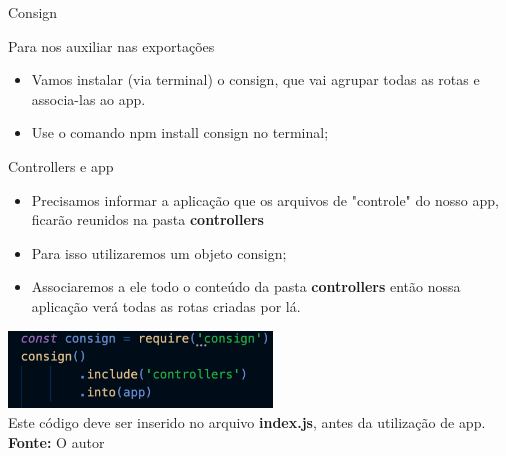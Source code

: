 \documentclass{beamer}
\begin{document}
    \begin{frame}[label=lists]{Consign}
		\begin{exampleblock}{Para nos auxiliar nas exportações}
	\begin{itemize}
	\item Vamos instalar (via terminal) o consign, que vai agrupar todas as rotas e associa-las ao \alert{app}.
	\item Use o comando \alert{npm install consign} no terminal;
	\end{itemize}
	\end{exampleblock}
    \end{frame}
    \begin{frame}[label=proof]{Controllers e app}
	\begin{itemize}
	\item Precisamos informar a aplicação que os arquivos de "controle" do nosso \alert{app}, ficarão reunidos na pasta \textbf{controllers}
	\item Para isso utilizaremos um objeto consign;
	\item Associaremos a ele todo o conteúdo da pasta \textbf{controllers} então nossa aplicação verá todas as rotas criadas por lá.
	\end{itemize}
	\begin{center}
    	\includegraphics[width=70mm]{resources/aula4_7.png}\\
        \tiny{ Este código deve ser inserido no arquivo \textbf{index.js}, antes da utilização de \alert{app}. \textbf{Fonte:} O autor}
     \end{center}
    \end{frame}
\end{document}
